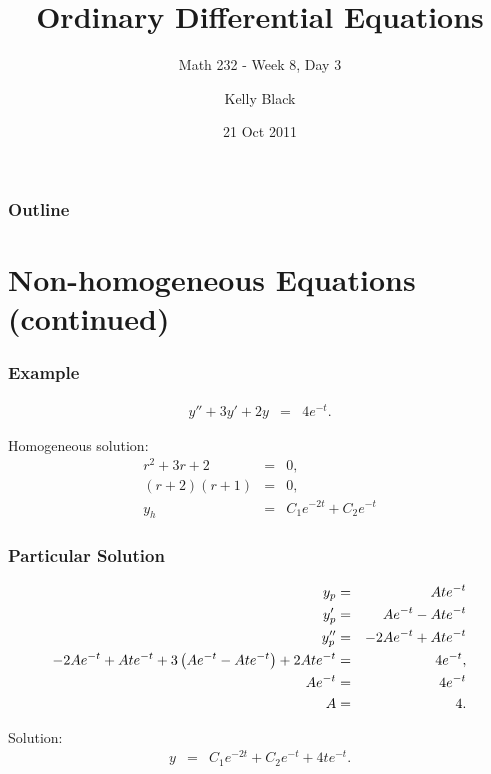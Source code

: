 
\title{Ordinary Differential Equations}
\subtitle{Math 232 - Week 8, Day 3}

\author{Kelly Black}
\date{21 Oct 2011}

\begin{frame}
  \titlepage
\end{frame}

\begin{frame}
  \frametitle{Outline}
\end{frame}


\section{Non-homogeneous Equations (continued)}


\begin{frame}
  \frametitle{Example}

  \begin{eqnarray*}
    y'' + 3y' + 2y & = & 4 e^{-t}.
  \end{eqnarray*}

  {
    Homogeneous solution:
    \begin{eqnarray*}
      r^2 + 3r + 2 & = & 0, \\
      (r+2)(r+1) & = & 0, \\
      y_h & = & C_1 e^{-2t} + C_2 e^{-t}
    \end{eqnarray*}
  }

\end{frame}

\begin{frame}
  \frametitle{Particular Solution}

  \begin{eqnarray*}
    y_p & = & A t e^{-t} \\
    y_p' & = & A e^{-t} - Ate^{-t} \\
    y_p'' & = & -2A e^{-t} + At e^{-t} \\
    -2A e^{-t} + At e^{-t} + 3 \left( A e^{-t} - Ate^{-t} \right) 
    + 2 A t e^{-t} & = & 4 e^{-t}, \\
    A e^{-t} & = & 4 e^{-t} \\
    A & = & 4.
  \end{eqnarray*}

  Solution:
  \begin{eqnarray*}
    y & = & C_1 e^{-2t} + C_2 e^{-t} + 4 t e^{-t}.
  \end{eqnarray*}

\end{frame}


